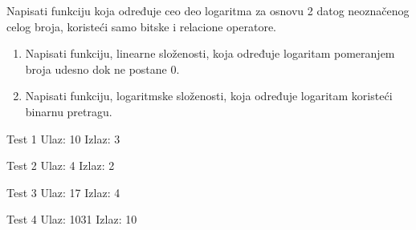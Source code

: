 \begin{Exercise}[label=408]
  Napisati funkciju koja određuje ceo deo logaritma za osnovu 2 datog
  neoznačenog celog broja, koristeći samo bitske i relacione
  operatore.
  \begin{enumerate}
  \item Napisati funkciju, linearne složenosti, koja određuje logaritam pomeranjem broja udesno dok ne postane 0.
  \item Napisati funkciju, logaritmske složenosti, koja određuje logaritam koristeći binarnu pretragu.
  \end{enumerate}
\begin{minitest}
\begin{test}{Test 1}
Ulaz:       10
Izlaz:      3
\end{test}
\end{minitest}
\begin{minitest}
\begin{test}{Test 2}
Ulaz:       4
Izlaz:      2
\end{test}
\end{minitest}
\begin{minitest}
\begin{test}{Test 3}
Ulaz:       17
Izlaz:      4
\end{test}
\end{minitest}

\begin{minitest}
\begin{test}{Test 4}
Ulaz:       1031
Izlaz:      10
\end{test}
\end{minitest}
  
\end{Exercise}

